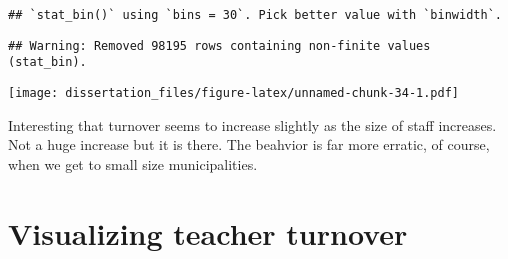 \documentclass[12pt,]{book}
\newenvironment{Shaded}{\begin{snugshade}}{\end{snugshade}}
\newcommand{\DataTypeTok}[1]{\textcolor[rgb]{0.13,0.29,0.53}{#1}}
\newcommand{\DecValTok}[1]{\textcolor[rgb]{0.00,0.00,0.81}{#1}}
\newcommand{\FloatTok}[1]{\textcolor[rgb]{0.00,0.00,0.81}{#1}}
\newcommand{\KeywordTok}[1]{\textcolor[rgb]{0.13,0.29,0.53}{\textbf{#1}}}
\newcommand{\NormalTok}[1]{#1}
\newcommand{\OperatorTok}[1]{\textcolor[rgb]{0.81,0.36,0.00}{\textbf{#1}}}
\newcommand{\StringTok}[1]{\textcolor[rgb]{0.31,0.60,0.02}{#1}}
\begin{document}
\begin{verbatim}
## `stat_bin()` using `bins = 30`. Pick better value with `binwidth`.
\end{verbatim}

\begin{verbatim}
## Warning: Removed 98195 rows containing non-finite values (stat_bin).
\end{verbatim}

\texttt{[image: dissertation\_files/figure-latex/unnamed-chunk-34-1.pdf]}

Interesting that turnover seems to increase slightly as the size of staff increases. Not a huge increase but it is there. The beahvior is far more erratic, of course, when we get to small size municipalities.

\hypertarget{visualizing-teacher-turnover}{%
\chapter{Visualizing teacher turnover}\label{visualizing-teacher-turnover}}

\begin{Shaded}
\end{Shaded}
\end{document}
